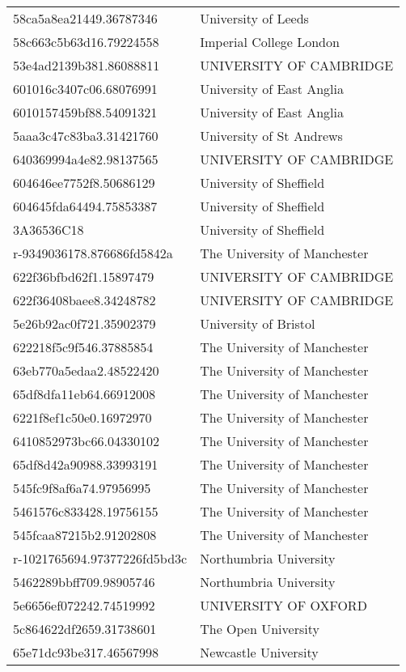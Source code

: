 \begin{tabular}{ll}
58ca5a8ea21449.36787346 & University of Leeds \\
58c663c5b63d16.79224558 & Imperial College London \\
53e4ad2139b381.86088811 & UNIVERSITY OF CAMBRIDGE \\
601016c3407c06.68076991 & University of East Anglia \\
6010157459bf88.54091321 & University of East Anglia \\
5aaa3c47c83ba3.31421760 & University of St Andrews \\
640369994a4e82.98137565 & UNIVERSITY OF CAMBRIDGE \\
604646ee7752f8.50686129 & University of Sheffield \\
604645fda64494.75853387 & University of Sheffield \\
3A36536C18 & University of Sheffield \\
r-9349036178.876686fd5842a & The University of Manchester \\
622f36bfbd62f1.15897479 & UNIVERSITY OF CAMBRIDGE \\
622f36408baee8.34248782 & UNIVERSITY OF CAMBRIDGE \\
5e26b92ac0f721.35902379 & University of Bristol \\
622218f5c9f546.37885854 & The University of Manchester \\
63eb770a5edaa2.48522420 & The University of Manchester \\
65df8dfa11eb64.66912008 & The University of Manchester \\
6221f8ef1c50e0.16972970 & The University of Manchester \\
6410852973bc66.04330102 & The University of Manchester \\
65df8d42a90988.33993191 & The University of Manchester \\
545fc9f8af6a74.97956995 & The University of Manchester \\
5461576c833428.19756155 & The University of Manchester \\
545fcaa87215b2.91202808 & The University of Manchester \\
r-1021765694.97377226fd5bd3c & Northumbria University \\
5462289bbff709.98905746 & Northumbria University \\
5e6656ef072242.74519992 & UNIVERSITY OF OXFORD \\
5c864622df2659.31738601 & The Open University \\
65e71dc93be317.46567998 & Newcastle University \\

\end{tabular}
